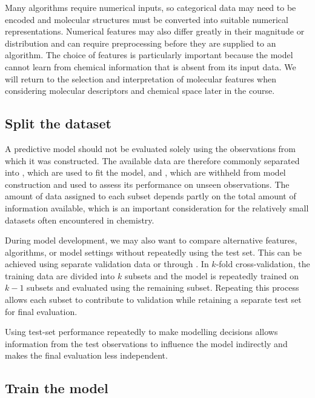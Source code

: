 Many algorithms require numerical inputs, so categorical data may need to be encoded and molecular structures must be converted into suitable numerical representations.
Numerical features may also differ greatly in their magnitude or distribution and can require preprocessing before they are supplied to an algorithm.
The choice of features is particularly important because the model cannot learn from chemical information that is absent from its input data.
We will return to the selection and interpretation of molecular features when considering molecular descriptors and chemical space later in the course.

\subsection{Split the dataset}

A predictive model should not be evaluated solely using the observations from which it was constructed.
The available data are therefore commonly separated into , which are used to fit the model, and , which are withheld from model construction and used to assess its performance on unseen observations.
The amount of data assigned to each subset depends partly on the total amount of information available, which is an important consideration for the relatively small datasets often encountered in chemistry.

During model development, we may also want to compare alternative features, algorithms, or model settings without repeatedly using the test set.
This can be achieved using separate validation data or through .
In \(k\)-fold cross-validation, the training data are divided into \(k\) subsets and the model is repeatedly trained on \(k - 1\) subsets and evaluated using the remaining subset.
Repeating this process allows each subset to contribute to validation while retaining a separate test set for final evaluation.

\begin{warningbox}

  Using test-set performance repeatedly to make modelling decisions allows information from the test observations to influence the model indirectly and makes the final evaluation less independent.
\end{warningbox}

\subsection{Train the model}


